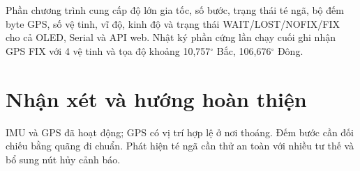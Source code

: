\documentclass[12pt]{article}
\begin{document}
\begin{evidencebox}
Phần chương trình cung cấp độ lớn gia tốc, số bước, trạng thái té ngã, bộ đếm byte GPS, số vệ tinh, vĩ độ, kinh độ và trạng thái WAIT/LOST/NOFIX/FIX cho cả OLED, Serial và API web. Nhật ký phần cứng lần chạy cuối ghi nhận GPS FIX với 4 vệ tinh và tọa độ khoảng 10,757$^\circ$ Bắc, 106,676$^\circ$ Đông.
\end{evidencebox}

\section{Nhận xét và hướng hoàn thiện}

IMU và GPS đã hoạt động; GPS có vị trí hợp lệ ở nơi thoáng. Đếm bước cần đối chiếu bằng quãng đi chuẩn. Phát hiện té ngã cần thử an toàn với nhiều tư thế và bổ sung nút hủy cảnh báo.
\end{document}
